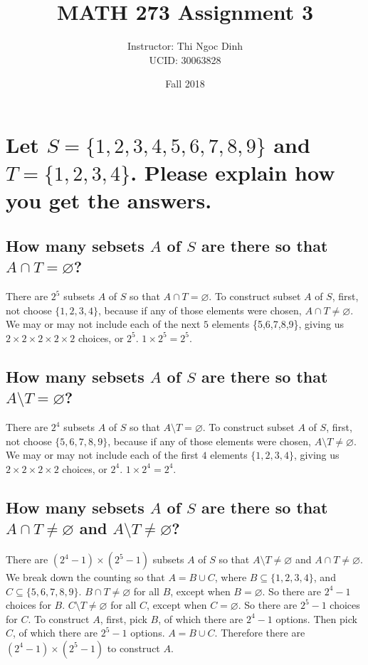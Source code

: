 \documentclass[10pt, letterpaper, titlepage]{article}
\title{MATH 273 Assignment 3}
\author{Instructor: Thi Ngoc Dinh
    \\UCID: 30063828}
\date{Fall 2018}
\newcommand{\0}{\varnothing}
\newcommand{\1}{\{ 1 \}}
\newcommand{\2}{\{ (1,1) \}}
\begin{document}
    \maketitle

    \section{Let $S = \{1,2,3,4,5,6,7,8,9\}$ and $T = \{1,2,3,4\}$. Please explain how you get the answers.}
        \subsection{How many sebsets $A$ of $S$ are there so that $A \cap T = \0$?}
            There are $2^5$ subsets $A$ of $S$ so that $A \cap T = \0$.
            To construct subset $A$ of $S$, first, not choose $\{1,2,3,4\}$, 
            because if any of those elements were chosen, $A \cap T \neq \0$. 
            We may or may not include each of the next $5$ elements \{5,6,7,8,9\},
            giving us $2 \times 2 \times 2 \times 2 \times 2$ choices, or $2^5$.
            $1 \times 2^5 = 2^5$.

        \subsection{How many sebsets $A$ of $S$ are there so that $A \setminus T = \0$?}
            There are $2^4$ subsets $A$ of $S$ so that $A \setminus T = \0$.
            To construct subset $A$ of $S$, first, not choose $\{5,6,7,8,9\}$,
            because if any of those elements were chosen, $A \setminus T \neq \0$.
            We may or may not include each of the first $4$ elements $\{1,2,3,4\}$, 
            giving us $2 \times 2 \times 2 \times 2$ choices, or $2^4$.
            $1 \times 2^4 = 2^4$.

        \subsection{How many sebsets $A$ of $S$ are there so that $A \cap T \neq \0$ and $A \setminus T \neq \0$?}
            There are $(2^4 - 1) \times (2^5-1)$ subsets $A$ of $S$ so that $A \setminus T \neq \0$ and $A \cap T \neq \0$.
            We break down the counting so that $A = B \cup C$,
            where $B \subseteq \{1,2,3,4\}$, and $C \subseteq \{5,6,7,8,9\}$.
            $B \cap T \neq \0$ for all $B$, except when $B = \0$.
            So there are $2^4 - 1$ choices for $B$.
            $C \setminus T \neq \0$ for all $C$, except when $C = \0$.
            So there are $2^5 - 1$ choices for $C$.
            To construct $A$, first, pick $B$, of which there are $2^4 -1$ options.
            Then pick $C$, of which there are $2^5-1$ options. 
            $A = B \cup C$.
            Therefore there are $(2^4 - 1) \times (2^5-1)$ to construct $A$.
\end{document}
